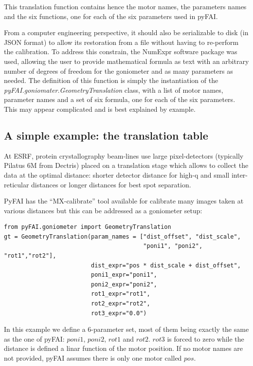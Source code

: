 \documentclass[preprint]{iucr}              %
\begin{document}
This translation function contains hence the motor names, the parameters names
and the six functions, one for each of the six parameters used in pyFAI. 

From a computer engineering perspective, it should also be serializable to 
disk (in JSON format) to allow its restoration from a file without having to
re-perform the calibration. 
To address this constrain, the NumExpr software package  \cite{numexpr} was
used, allowing the user to provide mathematical formula as text with an
arbitrary number of degrees of freedom for the goniometer and as many parameters
as needed.
The definition of this function is simply the instantiation of the
\textit{pyFAI.goniomater.GeometryTranslation} class, with a list of motor names,
parameter names and a set of six formula, one for each of the six parameters. 
This may appear complicated and is best explained by example.

\subsection{A simple example: the translation table}

At ESRF, protein crystallography beam-lines use large pixel-detectors (typically
Pilatus 6M from Dectris) placed on a translation stage which allows to collect
the data at the optimal distance: shorter detector distance for high-q and small
inter-reticular distances or longer distances for best spot separation.

PyFAI has the ``MX-calibrate'' tool available for calibrate many images taken at
various distances but this can be addressed as a goniometer setup: 

\begin{verbatim}
from pyFAI.goniometer import GeometryTranslation
gt = GeometryTranslation(param_names = ["dist_offset", "dist_scale", 
                                        "poni1", "poni2", "rot1","rot2"],
                         dist_expr="pos * dist_scale + dist_offset", 
                         poni1_expr="poni1",
                         poni2_expr="poni2", 
                         rot1_expr="rot1", 
                         rot2_expr="rot2", 
                         rot3_expr="0.0")
\end{verbatim}
 
In this example we define a 6-parameter set, most of them being exactly the same
as the one of pyFAI: $poni1$, $poni2$, $rot1$ and $rot2$. $rot3$ is forced to
zero while the distance is defined a linar function of the motor position.
If no motor names are not provided, pyFAI assumes there is only one motor
called $pos$.
\end{document}
